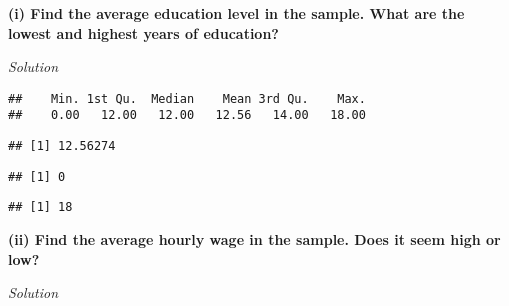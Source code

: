 \documentclass[
]{article}
\newenvironment{Shaded}{\begin{snugshade}}{\end{snugshade}}
\newcommand{\CommentTok}[1]{\textcolor[rgb]{0.56,0.35,0.01}{\textit{#1}}}
\newcommand{\KeywordTok}[1]{\textcolor[rgb]{0.13,0.29,0.53}{\textbf{#1}}}
\newcommand{\NormalTok}[1]{#1}
\newcommand{\OperatorTok}[1]{\textcolor[rgb]{0.81,0.36,0.00}{\textbf{#1}}}
\begin{document}
\textbf{(i) Find the average education level in the sample. What are the
lowest and highest years of education?}

\emph{Solution}

\begin{Shaded}
\end{Shaded}

\begin{verbatim}
##    Min. 1st Qu.  Median    Mean 3rd Qu.    Max. 
##    0.00   12.00   12.00   12.56   14.00   18.00
\end{verbatim}

\begin{Shaded}
\end{Shaded}

\begin{verbatim}
## [1] 12.56274
\end{verbatim}

\begin{Shaded}
\end{Shaded}

\begin{verbatim}
## [1] 0
\end{verbatim}

\begin{Shaded}
\end{Shaded}

\begin{verbatim}
## [1] 18
\end{verbatim}

\textbf{(ii) Find the average hourly wage in the sample. Does it seem
high or low? }

\emph{Solution}
\end{document}
